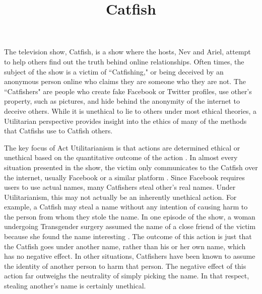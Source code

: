 \documentclass{paper}
\title{Catfish}
\begin{document}
\drafth{}
\inlinetitle

\begin{linenumbers}

The television show, Catfish, is a show where the hosts, Nev and Ariel, attempt to help others find out the truth behind online relationships. Often times, the subject of the show is a victim of ``Catfishing," or being deceived by an anonymous person online who claims they are someone who they are not. The ``Catfishers" are people who create fake Facebook or Twitter profiles, use other's property, such as pictures, and hide behind the anonymity of the internet to deceive others. While it is unethical to lie to others under most ethical theories, a Utilitarian perspective provides insight into the ethics of many of the methods that Catfishs use to Catfish others.

The key focus of Act Utilitarianism is that actions are determined ethical or unethical based on the quantitative outcome of the action \cite[74]{Ethics}. In almost every situation presented in the show, the victim only communicates to the Catfish over the internet, usually Facebook or a similar platform \cite{wiki}. Since Facebook requires users to use actual names, many Catfishers steal other's real names. Under Utilitarianism, this may not actually be an inherently unethical action. For example, a Catfish may steal a name without any intention of causing harm to the person from whom they stole the name. In one episode of the show, a woman undergoing Transgender surgery assumed the name of a close friend of the victim because she found the name interesting \cite{ctfs}. The outcome of this action is just that the Catfish goes under another name, rather than his or her own name, which has no negative effect. In other situations, Catfishers have been known to assume the identity of another person to harm that person. The negative effect of this action far outweighs the neutrality of simply picking the name. In that respect, stealing another's name is certainly unethical.


\end{linenumbers}
\end{document}
